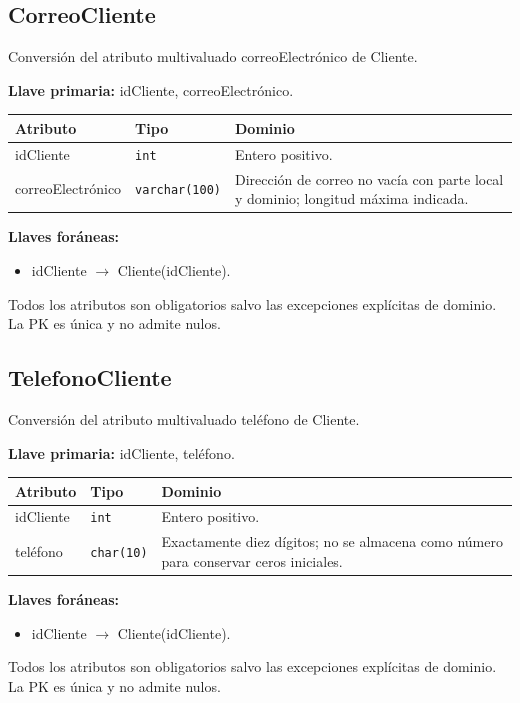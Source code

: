 \par\noindent\begin{minipage}{\textwidth}
\subsection{CorreoCliente}
Conversión del atributo multivaluado correoElectrónico de Cliente.\par
\textbf{Llave primaria:} idCliente, correoElectrónico.\par
{\small\begin{tabular}{@{}p{}p{}p{}@{}}
\toprule Atributo & Tipo & Dominio \\ \midrule
idCliente & \texttt{int} & Entero positivo. \\
correoElectrónico & \texttt{varchar(100)} & Dirección de correo no vacía con parte local y dominio; longitud máxima indicada. \\
\bottomrule\end{tabular}}
\textbf{Llaves foráneas:}\begin{itemize}[nosep]
\item idCliente $\rightarrow$ Cliente(idCliente).
\end{itemize}
Todos los atributos son obligatorios salvo las excepciones explícitas de dominio. La PK es única y no admite nulos.
\end{minipage}\par\vspace{.35cm}
\par\noindent\begin{minipage}{\textwidth}
\subsection{TelefonoCliente}
Conversión del atributo multivaluado teléfono de Cliente.\par
\textbf{Llave primaria:} idCliente, teléfono.\par
{\small\begin{tabular}{@{}p{}p{}p{}@{}}
\toprule Atributo & Tipo & Dominio \\ \midrule
idCliente & \texttt{int} & Entero positivo. \\
teléfono & \texttt{char(10)} & Exactamente diez dígitos; no se almacena como número para conservar ceros iniciales. \\
\bottomrule\end{tabular}}
\textbf{Llaves foráneas:}\begin{itemize}[nosep]
\item idCliente $\rightarrow$ Cliente(idCliente).
\end{itemize}
Todos los atributos son obligatorios salvo las excepciones explícitas de dominio. La PK es única y no admite nulos.
\end{minipage}\par\vspace{.35cm}
